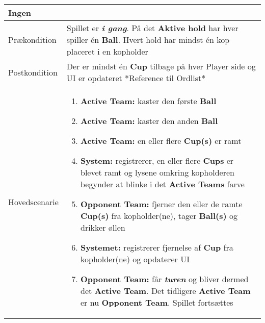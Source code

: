\documentclass[Kravspecifikation/Kravspec_Main.tex]{subfiles}
\begin{document}
\begin{longtable}[]{@{}ll@{}}
\begin{minipage}[t]{0.47\columnwidth}
{Ingen}\strut
\end{minipage}\tabularnewline
\toprule
\begin{minipage}[t]{0.47\columnwidth}\raggedright
{Prækondition}\strut
\end{minipage} & \begin{minipage}[t]{0.47\columnwidth}\raggedright
{Spillet er \textbf{\textit{i gang}}. På det \textbf{Aktive hold} har hver spiller én \textbf{Ball}. Hvert hold har mindst én kop placeret i en kopholder}\strut
\end{minipage}\tabularnewline
\toprule
\begin{minipage}[t]{0.47\columnwidth}\raggedright
{Postkondition}\strut
\end{minipage} & \begin{minipage}[t]{0.47\columnwidth}\raggedright
{Der er mindst én \textbf{Cup} tilbage på hver Player side og UI er opdateret *Reference til Ordlist*}\strut
\end{minipage}\tabularnewline
\toprule
\begin{minipage}[t]{0.47\columnwidth}\raggedright
{Hovedscenarie}\strut
\end{minipage} & \begin{minipage}[t]{0.47\columnwidth}\raggedright
\begin{enumerate}
\tightlist
\item
  {\textbf{Active Team:} kaster den første \textbf{Ball}}
\item
  {\textbf{Active Team:} kaster den anden \textbf{Ball}}
\item
  {\textbf{Active Team:} en eller flere \textbf{Cup(s)} er ramt 
  }
  \item
   {\textbf{System:} registrerer, en eller flere \textbf{Cups} er blevet ramt og lysene omkring kopholderen begynder at blinke i det \textbf{Active Teams} farve       }
\item
    {\textbf{Opponent Team:} fjerner den eller de ramte \textbf{Cup(s)} fra kopholder(ne), tager \textbf{Ball(s)} og drikker øllen}
\item 
    {\textbf{Systemet:} registrerer fjernelse af \textbf{Cup} fra kopholder(ne) og opdaterer UI}
\item  
    {\textbf{Opponent Team:} får \textbf{\textit{turen}} og bliver dermed det \textbf{Active Team}. Det tidligere \textbf{Active Team} er nu \textbf{Opponent Team}. Spillet fortsættes}
\end{enumerate}\strut


\end{minipage}
\end{longtable}
\end{document}
